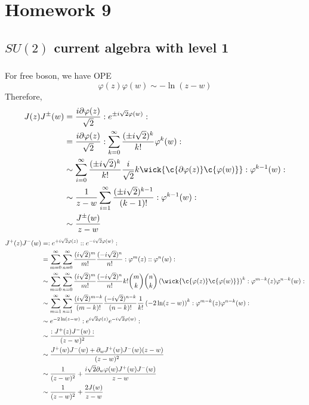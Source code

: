 \newpage
\section{Homework 9}
\subsection{$SU(2)$ current algebra with level 1}
\subsubsection{}
For free boson, we have OPE
\[
\varphi(z)\varphi(w) \sim - \ln (z-w)
\]
Therefore, 
\begin{equation}
\begin{split}
J(z)J^{\pm}(w) &= \frac{i\partial\varphi(z)}{\sqrt{2}}:e^{\pm i \sqrt{2}\varphi(w)}:\\
&= \frac{i \partial \varphi(z)}{\sqrt{2}}: \sum_{k=0}^{\infty} \frac{(\pm i\sqrt{2})^k}{k!} \varphi^k(w):\\
& \sim \sum_{i=0}^{\infty} \frac{(\pm i\sqrt{2})^k}{k!} \frac{i}{\sqrt{2}}k \wick{\c{\partial \varphi(z)} \c{\varphi(w)} }:\varphi^{k-1}(w):\\
& \sim \frac{1}{z-w}\sum_{i=1}^{\infty} \frac{(\pm i \sqrt{2})^{k-1}}{(k-1)!} : \varphi^{k-1}(w):\\
& \sim \frac{J^{\pm}(w)}{z-w}\\
\end{split}
\end{equation}
\begin{equation}
\begin{split}
J^{+}(z)J^{-}(w)& = : e^{+i \sqrt{2}\varphi(z)}:: e^{-i \sqrt{2}\varphi(w)}:\\
& = \sum_{m=0}^{\infty} \sum_{n=0}^{\infty}\frac{(i\sqrt{2})^m}{m!} \frac{(-i \sqrt{2})^n}{n!} : \varphi^m(z):: \varphi^n(w): \\
& \sim \sum_{m=0}^{\infty}\sum_{n=0}^{\infty} \frac{(i \sqrt{2})^m}{m!} \frac{(-i \sqrt{2})^n}{n!} k! \binom{m}{k}\binom{n}{k} \left(\wick{\c{\varphi(z)} \c{\varphi(w)} } \right)^k: \varphi^{m-k}(z) \varphi^{n-k}(w):\\
& \sim \sum_{m=1}^{\infty} \sum_{n=1}^{\infty} \frac{(i \sqrt{2})^{m-k}}{ (m-k)!} \frac{(-i \sqrt{2})^{n-k}}{(n-k)!} \frac{1}{k!} \left(-2\ln(z-w) \right)^k : \varphi^{m-k}(z) \varphi^{n-k}(w):\\
		& \sim e^{-2 \ln(z-w)}:e^{i \sqrt{2}\varphi(z)} e^{-i \sqrt{2}\varphi(w)}: \\
	& \sim \frac{:J^+(z)J^- (w):}{(z-w)^2} \\
	& \sim \frac{J^+(w) J^-(w)+ \partial_w J^+(w)J^-(w)(z-w)}{(z-w)^2} \\
	& \sim \frac{1}{(z-w)^2} + \frac{i \sqrt{2}\partial_w \varphi(w) J^+(w)J^-(w)}{z-w}\\
	& \sim \frac{1}{(z-w)^2} + \frac{2J(w)}{z-w}
\end{split}
\end{equation}
